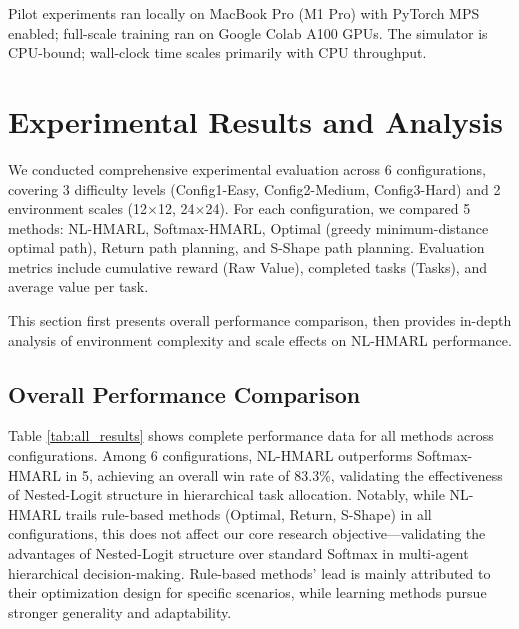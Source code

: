\documentclass[12pt,a4paper]{article}
\begin{document}
Pilot experiments ran locally on MacBook Pro (M1 Pro) with PyTorch MPS enabled; full-scale training ran on Google Colab A100 GPUs. The simulator is CPU-bound; wall-clock time scales primarily with CPU throughput.

\section{Experimental Results and Analysis}

We conducted comprehensive experimental evaluation across 6 configurations, covering 3 difficulty levels (Config1-Easy, Config2-Medium, Config3-Hard) and 2 environment scales (12$\times$12, 24$\times$24). For each configuration, we compared 5 methods: NL-HMARL, Softmax-HMARL, Optimal (greedy minimum-distance optimal path), Return path planning, and S-Shape path planning. Evaluation metrics include cumulative reward (Raw Value), completed tasks (Tasks), and average value per task.

This section first presents overall performance comparison, then provides in-depth analysis of environment complexity and scale effects on NL-HMARL performance.

\subsection{Overall Performance Comparison}

Table \ref{tab:all_results} shows complete performance data for all methods across configurations. Among 6 configurations, NL-HMARL outperforms Softmax-HMARL in 5, achieving an overall win rate of 83.3\%, validating the effectiveness of Nested-Logit structure in hierarchical task allocation. Notably, while NL-HMARL trails rule-based methods (Optimal, Return, S-Shape) in all configurations, this does not affect our core research objective---validating the advantages of Nested-Logit structure over standard Softmax in multi-agent hierarchical decision-making. Rule-based methods' lead is mainly attributed to their optimization design for specific scenarios, while learning methods pursue stronger generality and adaptability.
\end{document}
